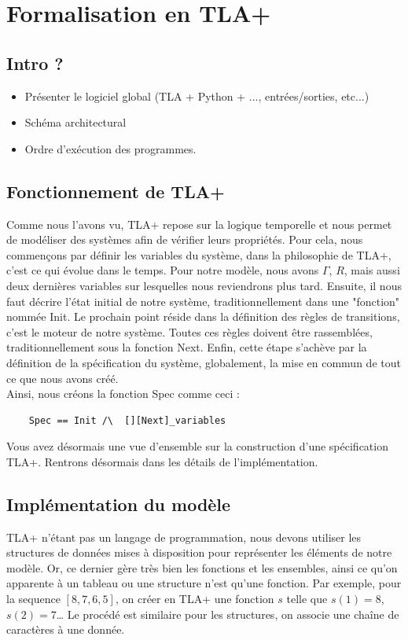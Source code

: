 \documentclass[runningheads]{llncs}
\begin{document}
\section{Formalisation en TLA+}
\label{sec:tla-formalisation}

\subsection{Intro ?}

\begin{itemize}
	\item Présenter le logiciel global (TLA + Python + ..., entrées/sorties, etc...)
	\item Schéma architectural
	\item Ordre d'exécution des programmes.
\end{itemize}

\subsection{Fonctionnement de TLA+}
Comme nous l'avons vu, TLA+ repose sur la logique temporelle et nous permet de modéliser des systèmes afin de vérifier leurs propriétés.
Pour cela, nous commençons par définir les variables du système, dans la philosophie de TLA+, c'est ce qui évolue dans le temps. 
Pour notre modèle, nous avons $\Gamma$, $R$, mais aussi deux dernières variables sur lesquelles nous reviendrons plus tard.
Ensuite, il nous faut décrire l'état initial de notre système, traditionnellement dans une "fonction" nommée Init.
Le prochain point réside dans la définition des règles de transitions, c'est le moteur de notre système. 
Toutes ces règles doivent être rassemblées, traditionnellement sous la fonction Next. 
Enfin, cette étape s'achève par la définition de la spécification du système, globalement, la mise en commun de tout ce que nous avons créé.
\\Ainsi, nous créons la fonction Spec comme ceci :
\begin{verbatim}
    Spec == Init /\  [][Next]_variables
\end{verbatim}%
Vous avez désormais une vue d'ensemble sur la construction d'une spécification TLA+.
Rentrons désormais dans les détails de l'implémentation.


\subsection{Implémentation du modèle}
TLA+ n'étant pas un langage de programmation, nous devons utiliser les structures de données mises à disposition pour représenter les éléments de notre modèle.
Or, ce dernier gère très bien les fonctions et les ensembles, ainsi ce qu'on apparente à un tableau ou une structure n'est qu'une fonction.
Par exemple, pour la sequence $[8,7,6,5]$, on créer en TLA+ une fonction $s$ telle que $s(1) = 8$, $s(2) = 7$\dots
Le procédé est similaire pour les structures, on associe une chaîne de caractères à une donnée.
\end{document}
